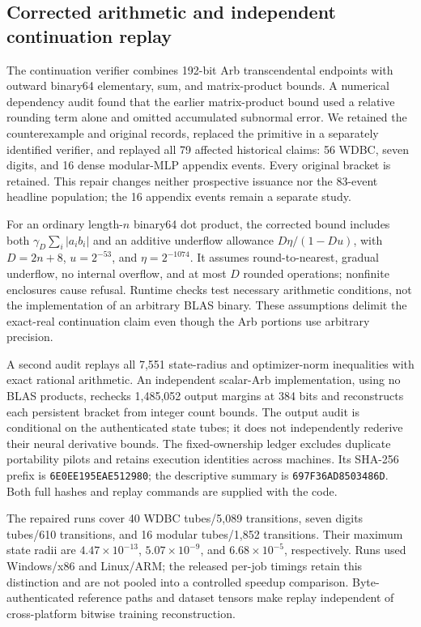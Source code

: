 \documentclass{article}
\begin{document}
\subsection{Corrected arithmetic and independent continuation replay}
\label{app:repaired-arithmetic}

The continuation verifier combines 192-bit Arb transcendental endpoints with
outward binary64 elementary, sum, and matrix-product bounds.  A numerical
dependency audit found that the earlier matrix-product bound used a relative
rounding term alone and omitted accumulated subnormal error.  We retained the
counterexample and original records, replaced the primitive in a separately
identified verifier, and replayed all 79 affected historical claims: 56 WDBC,
seven digits, and 16 dense modular-MLP appendix events.  Every original bracket
is retained.  This repair changes neither prospective issuance nor the 83-event
headline population; the 16 appendix events remain a separate study.

For an ordinary length-$n$ binary64 dot product, the corrected bound includes
both $\gamma_D\sum_i|a_i b_i|$ and an additive underflow allowance
$D\eta/(1-Du)$, with $D=2n+8$, $u=2^{-53}$, and $\eta=2^{-1074}$.
It assumes round-to-nearest, gradual underflow, no internal overflow, and at
most $D$ rounded operations; nonfinite enclosures cause refusal.  Runtime
checks test necessary arithmetic conditions, not the implementation of an
arbitrary BLAS binary.  These assumptions delimit the exact-real continuation
claim even though the Arb portions use arbitrary precision.

A second audit replays all 7,551 state-radius and optimizer-norm inequalities
with exact rational arithmetic.  An independent scalar-Arb implementation,
using no BLAS products, rechecks 1,485,052 output margins at 384 bits and
reconstructs each persistent bracket from integer count bounds.  The output
audit is conditional on the authenticated state tubes; it does not independently
rederive their neural derivative bounds.  The fixed-ownership ledger excludes
duplicate portability pilots and retains execution identities across machines.
Its SHA-256 prefix is \texttt{6E0EE195EAE512980}; the descriptive summary is
\texttt{697F36AD8503486D}.  Both full hashes and replay commands are supplied
with the code.

The repaired runs cover 40 WDBC tubes/5,089 transitions, seven digits
tubes/610 transitions, and 16 modular tubes/1,852 transitions.  Their maximum
state radii are $4.47\times10^{-13}$, $5.07\times10^{-9}$, and
$6.68\times10^{-5}$, respectively.  Runs used Windows/x86 and Linux/ARM;
the released per-job timings retain this distinction and are not pooled into
a controlled speedup comparison.  Byte-authenticated reference paths and
dataset tensors make replay independent of cross-platform bitwise training
reconstruction.
\end{document}
